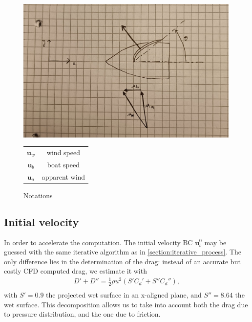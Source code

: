     \begin{figure}[ht!]
        \centering
        \begin{minipage}{0.65\textwidth}
            \includegraphics[width=0.99\textwidth]{figures/axes.jpeg}%
        \end{minipage}
        \begin{minipage}{0.34\textwidth}
            \vfill
            \begin{tabular}{c|c}
                $\mathbf{u}_w$ & wind speed \\
                $\mathbf{u}_b$ & boat speed \\
                $\mathbf{u}_a$ & apparent wind
            \end{tabular}
            \vfill
        \end{minipage}
        
        \caption{Notations}
        \label{fig:speedtriangle}
    \end{figure}

\subsection{Initial velocity }
    In order to accelerate the computation. The initial velocity BC $\mathbf{u}_b^0$ may be guessed with the same iterative algorithm as in \ref{section:iterative_process}. The only difference lies in the determination of the drag: instead of an accurate but costly CFD computed drag, we estimate it with 
    \begin{eqnarray}
        D'+D'' = \frac{1}{2}\rho u^2 \left(S' C_d' +S'' C_d''\right), \\ 
        \label{eqn:drag_estimation}
    \end{eqnarray}
    with $S'= 0.9$ the projected wet surface in an x-aligned plane, and $S''= 8.64 $ the wet surface. This decomposition allows us to take into account both the drag due to pressure distribution, and the one due to friction. 

